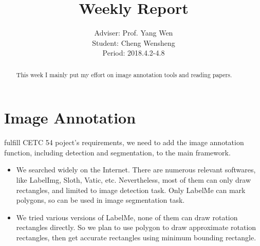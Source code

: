 \documentclass[]{IEEEtran}
\begin{document}
	\title{Weekly Report}
	\author{Adviser: Prof. Yang Wen \\Student: Cheng Wensheng\\ Period: 2018.4.2-4.8
	}
	\maketitle

\begin{abstract}
	This week I mainly put my effort on image annotation tools and reading papers.
\end{abstract}

\section{Image Annotation}
	 fulfill CETC 54 poject's requirements, we need to add the image annotation function, including detection and segmentation, to the main framework.
	\begin{itemize}
		\item We searched widely on the Internet. There are numerous relevant softwares, like LabelImg, Sloth, Vatic, etc. Nevertheless, most of them can only draw rectangles, and limited to image detection task. Only LabelMe can mark polygons, so can be used in image segmentation task.
		\item We tried various versions of LabelMe, none of them can draw rotation rectangles directly. So we plan to use polygon to draw approximate rotation rectangles, then get accurate rectangles using minimum bounding rectangle.
	\end{itemize}

\end{document}
